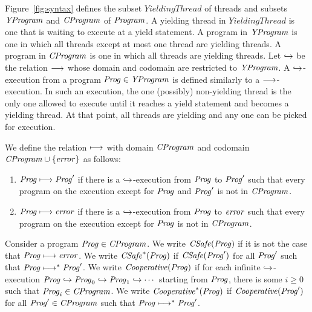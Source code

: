 Figure~\ref{fig:syntax} defines the subset $\mathit{YieldingThread}$ of threads and subsets 
$\mathit{YProgram}$ and $\mathit{CProgram}$ of $\mathit{Program}$.
A yielding thread in $\mathit{YieldingThread}$ is one that is waiting to execute at a yield statement.
A program in $\mathit{YProgram}$ is one in which all threads except at most one thread are yielding threads.
A program in $\mathit{CProgram}$ is one in which all threads are yielding threads.
Let $\hookrightarrow$ be the relation $\longrightarrow$ whose domain and codomain are restricted to $\mathit{YProgram}$.
A $\hookrightarrow$-execution from a program $\mathit{Prog} \in \mathit{YProgram}$ is defined similarly to a $\longrightarrow$-execution.
In such an execution, the one (possibly) non-yielding thread is the only one allowed to execute until it reaches 
a yield statement and becomes a yielding thread.
At that point, all threads are yielding and any one can be picked for execution.

We define the relation $\longmapsto$ with domain $\mathit{CProgram}$ and codomain $\mathit{CProgram} \cup \{\mathit{error}\}$ as follows:
\begin{enumerate}
\item 
$\mathit{Prog} \longmapsto \mathit{Prog}'$ if there is a $\hookrightarrow$-execution from $\mathit{Prog}$ to $\mathit{Prog}'$ such that every program on the execution 
except for $\mathit{Prog}$ and $\mathit{Prog}'$ is not in $\mathit{CProgram}$.
\item
$\mathit{Prog} \longmapsto \mathit{error}$ if there is a $\hookrightarrow$-execution from $\mathit{Prog}$ to $\mathit{error}$ such that every program on the execution 
except for $\mathit{Prog}$ is not in $\mathit{CProgram}$.
\end{enumerate}

Consider a program $\mathit{Prog} \in \mathit{CProgram}$.
We write $\mathit{CSafe}(\mathit{Prog})$ if it is not the case that $\mathit{Prog} \longmapsto \mathit{error}$.
We write $\mathit{CSafe}^*(\mathit{Prog})$ if $\mathit{CSafe}(\mathit{Prog}')$ for all $\mathit{Prog}'$ such that $\mathit{Prog} \longmapsto^* \mathit{Prog}'$.
We write $\mathit{Cooperative}(\mathit{Prog})$ if for each infinite $\hookrightarrow$-execution $\mathit{Prog} \hookrightarrow \mathit{Prog}_0 \hookrightarrow \mathit{Prog}_1 \hookrightarrow \cdots$ 
starting from $\mathit{Prog}$, there is some $i \geq 0$ such that $\mathit{Prog}_i \in \mathit{CProgram}$.
We write $\mathit{Cooperative}^*(\mathit{Prog})$ if $\mathit{Cooperative}(\mathit{Prog}')$ for all $\mathit{Prog}' \in \mathit{CProgram}$ such that $\mathit{Prog} \longmapsto^* \mathit{Prog}'$.
